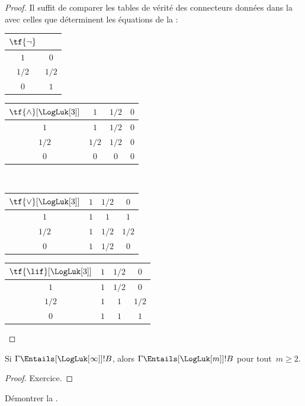 \documentclass[../../../include/open-logic-section]{subfiles}
\begin{document}
\begin{proof}
  Il suffit de comparer les tables
  de vérité des connecteurs données
  dans la 
  avec celles que déterminent les
  équations de la
   :
  \begin{center}
    \begin{tabular}{c|c}
      $\tf{\lnot}$ & \\
      \hline
      $1$ & $0$ \\
      $1/2$ & $1/2$ \\
      $0$ & $1$
    \end{tabular}
    \quad
    \begin{tabular}{c|ccc}
      $\tf{\land}[\LogLuk[3]]$ & $1$ & $1/2$ & $0$ \\
      \hline
      $1$ & $1$ & $1/2$ & $0$ \\
      $1/2$ & $1/2$ & $1/2$ & $0$ \\
      $0$ & $0$ & $0$ & $0$
    \end{tabular}
    \\[2ex]
    \begin{tabular}{c|ccc}
      $\tf{\lor}[\LogLuk[3]]$ & $1$ & $1/2$ & $0$ \\
      \hline
      $1$ & $1$ & $1$ & $1$ \\
      $1/2$ & $1$ & $1/2$ & $1/2$ \\
      $0$ & $1$ & $1/2$ & $0$
    \end{tabular}
    \quad
    \begin{tabular}{c|ccc}
      $\tf{\lif}[\LogLuk[3]]$ & $1$ & $1/2$ & $0$ \\
      \hline
      $1$ & $1$ & $1/2$ & $0$ \\
      $1/2$ & $1$ & $1$ & $1/2$ \\
      $0$ & $1$ & $1$ & $1$
    \end{tabular}
  \end{center}
\end{proof}

\begin{prop}
  Si $\Gamma\Entails[\LogLuk[\infty]] !B$,
  alors
  $\Gamma\Entails[\LogLuk[m]] !B$
  pour tout~$m\ge2$.
\end{prop}

\begin{proof}
  Exercice.
\end{proof}

\begin{prob}
  Démontrer la
  .
\end{prob}
\end{document}
